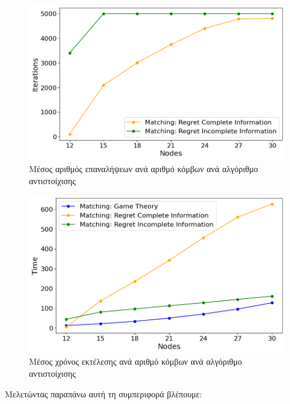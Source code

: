 \begin{figure}[H]
    \centering
    \includegraphics[width=\textwidth]{figures/chapter4/Iterations_vs_Users.png}
    \caption{Μέσος αριθμός επαναλήψεων ανά αριθμό κόμβων ανά αλγόριθμο αντιστοίχισης}
    \label{fig39}
\end{figure}

\newpage

\begin{figure}[H]
    \centering
    \includegraphics[width=\textwidth]{figures/chapter4/Time_vs_Users.png}
    \caption{Μέσος χρόνος εκτέλεσης ανά αριθμό κόμβων ανά αλγόριθμο αντιστοίχισης}
    \label{fig40}
\end{figure}

Μελετώντας παραπάνω αυτή τη συμπεριφορά βλέπουμε:

